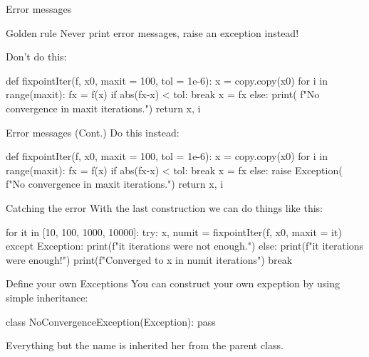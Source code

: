 \documentclass[hyperref={pdfpagelabels=false},table]{beamer}
\begin{document}
\begin{frame}[fragile]{Error messages}
\begin{alertblock}{Golden rule}
Never print error messages, \alert{raise an exception instead}!
\end{alertblock}
\vfill

Don't do this:
\begin{python}
def fixpointIter(f, x0, maxit = 100, tol = 1e-6):
  x = copy.copy(x0)
  for i in range(maxit):
    fx = f(x)
    if abs(fx-x) < tol:
      break
    x = fx
  else:
    print(
     f"No convergence in {maxit} iterations.")
  return x, i
\end{python}
\end{frame}
\begin{frame}[fragile]{Error messages (Cont.)}
Do this instead:
\begin{python}
def fixpointIter(f, x0, maxit = 100, tol = 1e-6):
  x = copy.copy(x0)
  for i in range(maxit):
    fx = f(x)
    if abs(fx-x) < tol:
      break
    x = fx
  else:
    raise Exception(
        f"No convergence in {maxit} iterations.")
  return x, i
\end{python}
\end{frame}

\begin{frame}[fragile]{Catching the error}
With the last construction we can do things like this:
\begin{python}
for it in [10, 100, 1000, 10000]:
  try:
    x, numit = fixpointIter(f, x0, maxit = it)
  except Exception:
    print(f"{it} iterations were not enough.")
  else:
    print(f"{it} iterations were enough!")
    print(f"Converged to {x} in {numit} iterations")
    break    
\end{python}


\end{frame}

\begin{frame}[fragile]{Define your own Exceptions}
You can construct your own expeption by using simple inheritance:
\vfill
\begin{python}
 class NoConvergenceException(Exception):
    pass
\end{python}
\vfill
Everything but the name is inherited her from the parent class.

\end{frame}
\end{document}
